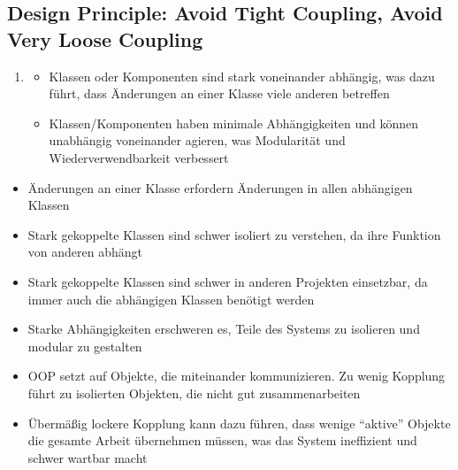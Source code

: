 \subsection{Design Principle: Avoid Tight Coupling, Avoid Very Loose Coupling}
\begin{infoBox}[title=Design-Prinzip: Vermeidung von starker Kopplung (aber nicht zu locker)]
    \begin{enumerate}
        \item {}
        \begin{itemize}
            \item {} Klassen oder Komponenten sind stark voneinander abhängig, was dazu führt, dass Änderungen an einer Klasse viele anderen betreffen
            \item {} Klassen/Komponenten haben minimale Abhängigkeiten und können unabhängig voneinander agieren, was Modularität und Wiederverwendbarkeit verbessert
        \end{itemize}
    \end{enumerate}
\end{infoBox}
\begin{infoBox}[title=Warum starke Kopplung problematisch ist:]
    \begin{itemize}
        \item {} Änderungen an einer Klasse erfordern Änderungen in allen abhängigen Klassen
        \item {} Stark gekoppelte Klassen sind schwer isoliert zu verstehen, da ihre Funktion von anderen abhängt
        \item {} Stark gekoppelte Klassen sind schwer in anderen Projekten einsetzbar, da immer auch die abhängigen Klassen benötigt werden
        \item {} Starke Abhängigkeiten erschweren es, Teile des Systems zu isolieren und modular zu gestalten
    \end{itemize}
\end{infoBox}
\begin{infoBox}[title=Warum zu lockere Kopplung ebenfalls problematisch ist:]
    \begin{itemize}
        \item {} OOP setzt auf Objekte, die miteinander kommunizieren. Zu wenig Kopplung führt zu isolierten Objekten, die nicht gut zusammenarbeiten
        \item {} Übermäßig lockere Kopplung kann dazu führen, dass wenige \enquote{aktive} Objekte die gesamte Arbeit übernehmen müssen, was das System ineffizient und schwer wartbar macht
    \end{itemize}
\end{infoBox}
